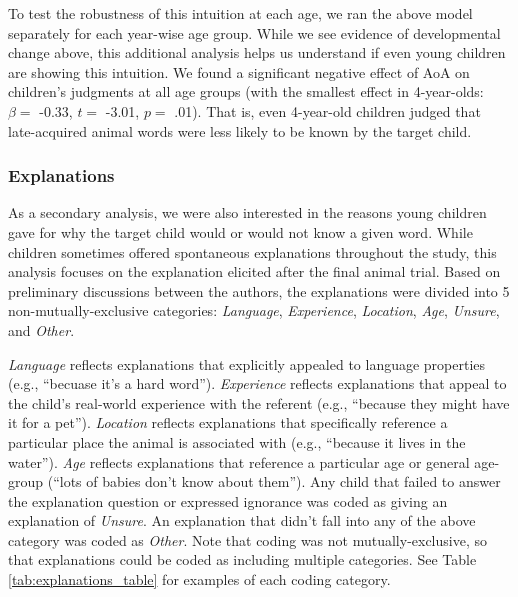\documentclass[10pt, letterpaper]{article}
\begin{document}
To test the robustness of this intuition at each age, we ran the above
model separately for each year-wise age group. While we see evidence of
developmental change above, this additional analysis helps us understand
if even young children are showing this intuition. We found a
significant negative effect of AoA on children's judgments at all age
groups (with the smallest effect in 4-year-olds: \(\beta =\) -0.33,
\(t =\) -3.01, \(p =\) .01). That is, even 4-year-old children judged
that late-acquired animal words were less likely to be known by the
target child.

\hypertarget{explanations}{%
\subsubsection{Explanations}\label{explanations}}

As a secondary analysis, we were also interested in the reasons young
children gave for why the target child would or would not know a given
word. While children sometimes offered spontaneous explanations
throughout the study, this analysis focuses on the explanation elicited
after the final animal trial. Based on preliminary discussions between
the authors, the explanations were divided into 5 non-mutually-exclusive
categories: \emph{Language}, \emph{Experience}, \emph{Location},
\emph{Age}, \emph{Unsure}, and \emph{Other}.

\emph{Language} reflects explanations that explicitly appealed to
language properties (e.g., ``becuase it's a hard word'').
\emph{Experience} reflects explanations that appeal to the child's
real-world experience with the referent (e.g., ``because they might have
it for a pet''). \emph{Location} reflects explanations that specifically
reference a particular place the animal is associated with (e.g.,
``because it lives in the water''). \emph{Age} reflects explanations
that reference a particular age or general age-group (``lots of babies
don't know about them''). Any child that failed to answer the
explanation question or expressed ignorance was coded as giving an
explanation of \emph{Unsure}. An explanation that didn't fall into any
of the above category was coded as \emph{Other}. Note that coding was
not mutually-exclusive, so that explanations could be coded as including
multiple categories. See Table \ref{tab:explanations_table} for examples
of each coding category.
\end{document}
